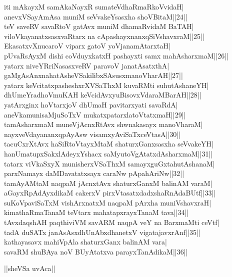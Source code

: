 \documentclass{article}
\begin{document}
iti mAkayxM samAkaNayxR sumateVdhaRmaRkoVvidaH|\\
anevxVSayAmAsa muniM seVvakeYsasxha shoVBitaM||24||\\
teV saveRV savaRtoV gatAvx muniM dhamaRvidaM BaTAH|\\
viloVkayanatxsasxvaRtarx na cApashayxnanxqSiVshavxraM||25||\\
EkasatxvXnucaroV viparx gatoV yoVjanamAtarxtaH|\\
pUvaRsAyxM dishi coVduyxkatxH pashayxti samx mahAsharxmaM||26||\\
yatarx niveYRriNasasxveRV paravoV janatAsatxthA|\\
gaMgAsAnxnahatAsheVSakilibxSAsusxmanoVharAH||27||\\
yatarx keVcitatxpasheshxrXVSaThxM kuvaRMti suhutAshaneYH|\\
dhUmeYradhoVmuKAH keVcidAvxyuBisovxVdaraMBarAH||28||\\
yatArxginx hoVtarxjoV dhUmaH pavitarxyati savaRdA|\\
aneVkamunisaMjuSoTxV mukatxpatarxlatoVtatxmaH||29||\\
tamAsharxmaM muneVjAcnxRtAvx shwnakasayx manoVharaM|\\
nayxveVdayananxqpAyAsw visamxyAviSaTxceVtasA||30||\\
tacuCxrXtAvx haSiRtoVtayxMtaM shaturxGanxsasxha seVvakeYH|\\
hanUmatupxSakxlAdeyxYshacx saMyutoVgAtatxdAsharxmaM||31||\\
tatarx viVkaSxyX munisherxVSaThxM samayxguGxtahutAshanaM|\\
parxNamayx daMDavatatxsayx caraNw pApahAriNw||32||\\
tamAyAMtaM naqpaM jAcnxtAvx shaturxGanxM balinAM varaM|\\
aGayxRpAdAyxdikaM cakerxV pirxVtasatxdadxshaRnAdaBUtf||33||\\
suKoVpaviSaTxM vishArxnatxM naqpaM pArxha muniVshavxraH|\\
kimathaRmaTanaM teVtarx mahatapxrayxTanaM tava||34||\\
tAvxdaqshAH paqthiviVM savARM naqpA veY na BarxmaMti ceVtf|\\
tadA duSATx janAsAsxdhUnAbxdhanetxV vigatajavxrAnf||35||\\
kathayasavx mahiVpAla shaturxGanx balinAM vara|\\
savaRM shuBAya noV BUyAtatxva parayxTanAdikaM||36||\\

\begin{center}
||sheVSa uvAca||
\end{center}
\end{document}
